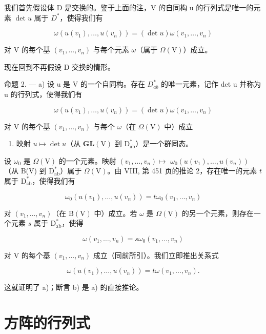 我们首先假设体 D 是交换的。鉴于上面的注，V 的自同构 u 的行列式是唯一的元素 \(\det u\) 属于 \(D^{*}\)，使得我们有

\[
\omega (u (v _ {1}), \ldots , u (v _ {n})) = (\det u) \omega (v _ {1}, \ldots , v _ {n})\tag{14}
\]

对 V 的每个基 \((v_{1},\ldots ,v_{n})\) 与每个元素 \(\omega\)（属于 \(\Omega (\mathrm{V})\)）成立。

现在回到不再假设 D 交换的情形。

命题 2. --- a) 设 u 是 V 的一个自同构。存在 \(D_{ab}^{*}\) 的唯一元素，记作 det u 并称为 u 的行列式，使得我们有

\[
\omega (u (v _ {1}), \ldots , u (v _ {n})) = (\det u) \omega (v _ {1}, \ldots , v _ {n})\tag{15}
\]

对 V 的每个基 \((v_{1},\ldots ,v_{n})\) 与每个 \(\omega\)（在 \(\Omega (\mathrm{V})\) 中）成立

\begin{enumerate}
\def\labelenumi{\alph{enumi})}
\setcounter{enumi}{1}
\tightlist
\item
  映射 \(u \mapsto \det u\)（从 \(\mathbf{GL}(\mathrm{V})\) 到 \(\mathrm{D}_{\mathrm{ab}}^{*}\)）是一个群同态。
\end{enumerate}

设 \(\omega_0\) 是 \(\Omega (\mathrm{V})\) 的一个元素。映射 \((v_{1},\ldots ,v_{n})\mapsto\) \(\omega_0(u(v_1),\dots ,u(v_n))\)（从 B(V) 到 \(\mathrm{D}_{\mathrm{ab}}^{*}\)）属于 \(\Omega (\mathrm{V})\)。由 VIII, 第 451 页的推论 2，存在唯一的元素 \(t\) 属于 \(\mathrm{D}_{\mathrm{ab}}^{*}\)，使得我们有

\[
\omega_ {0} (u (v _ {1}), \ldots , u (v _ {n})) = t \omega_ {0} (v _ {1}, \ldots , v _ {n})
\]

对 \((v_{1},\ldots ,v_{n})\)（在 \(\mathrm{B(V)}\) 中）成立。若 \(\omega\) 是 \(\Omega (\mathrm{V})\) 的另一个元素，则存在一个元素 \(s\) 属于 \(\mathrm{D}_{\mathrm{ab}}^{*}\)，使得

\[
\omega (v _ {1}, \ldots , v _ {n}) = s \omega_ {0} (v _ {1}, \ldots , v _ {n})
\]

对 V 的每个基 \((v_{1},\ldots ,v_{n})\) 成立（同前所引）。我们立即推出关系式

\[
\omega (u (v _ {1}), \dots , u (v _ {n})) = t \omega (v _ {1}, \dots , v _ {n}).
\]

这就证明了 a)；断言 b) 是 a) 的直接推论。

\section{方阵的行列式}

